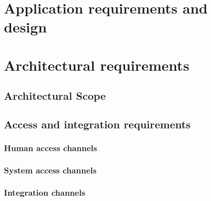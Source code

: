 \documentclass[a4paper,12pt,titlepage]{article}
\begin{document}


\tableofcontents
\newpage


\section{Application requirements and design}


\newpage

\newpage

\newpage

\newpage

\newpage



\section{Architectural requirements}
	\subsection{Architectural Scope} %
	
	\newpage
	
	\subsection{Access and integration requirements}
			\subsubsection{Human access channels}	
				
			\subsubsection{System access channels}
					
			\subsubsection{Integration channels}
				
\end{document}
